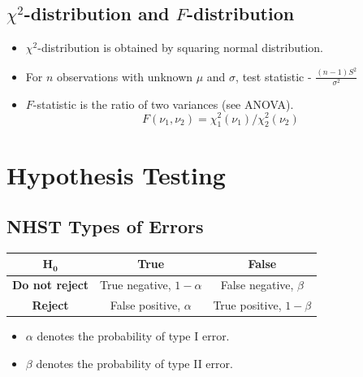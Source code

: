 \documentclass{article}
\begin{document}
\subsection*{$\chi^{2}$-distribution and $F$-distribution}
\begin{itemize}
    \item $\chi^{2}$-distribution is obtained by squaring normal distribution.
    \item For $n$ observations with unknown $\mu$ and $\sigma$, test statistic - $\displaystyle \frac{(n-1)S^{2}}{\sigma^{2}} $

    \item $F$-statistic is the ratio of two variances (see ANOVA).\[F(\nu_{1}, \nu_{2}) = \chi_{1}^{2}(\nu_{1})/ \chi_{2}^{2}(\nu_{2})\]
\end{itemize}

\newpage
\section{Hypothesis Testing}
\subsection*{NHST Types of Errors}
\begin{minipage}{0.5\textwidth}
\begin{table}[H]
    \begin{tabular}{|c|c|c|}\hline
        $\mathbf{H_{0}}$ & \textbf{True} & \textbf{False} \\\hline
        \textbf{Do not reject} & True negative, $1-\alpha$ & False negative, $\beta$\\ \hline
        \textbf{Reject} & False positive, $\alpha$ & True positive, $1-\beta$\\ \hline
    \end{tabular}
\end{table}
\end{minipage} \hfill
\begin{minipage}{0.45\textwidth} \vspace{.2cm}
\begin{itemize}
    \item $\alpha$ denotes the probability of type I error.
    \item $\beta$ denotes the probability of type II error.
\end{itemize}
\end{minipage}
\end{document}
